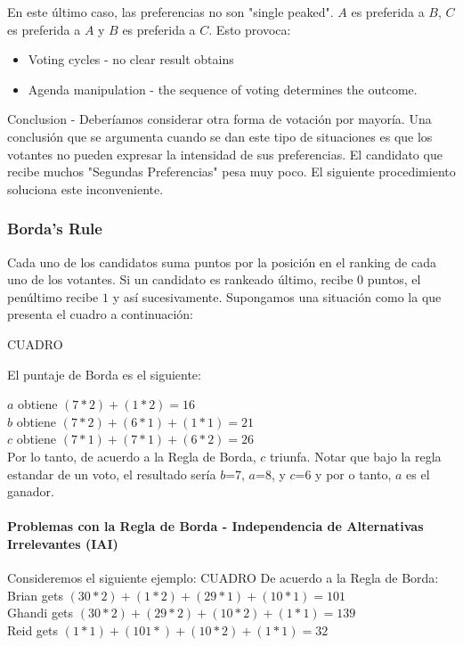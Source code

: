 En este último caso, las preferencias no son "single peaked". $A$ es preferida a $B$, $C$ es preferida a $A$ y $B$ es preferida a $C$. Esto provoca:
\begin{itemize}
 \item Voting cycles - no clear result obtains
 \item Agenda manipulation - the sequence of voting determines the outcome.
\end{itemize}
Conclusion - Deberíamos considerar otra forma de votación por mayoría. Una conclusión que se argumenta cuando se dan este tipo de situaciones es que los votantes no pueden expresar la intensidad de sus preferencias. El candidato que recibe muchos "Segundas Preferencias" pesa muy poco. El siguiente procedimiento soluciona este inconveniente.
\subsubsection{Borda’s Rule}
Cada uno de los candidatos suma puntos por la posición en el ranking de cada uno de los votantes. Si un candidato es rankeado último, recibe $0$ puntos, el penúltimo recibe $1$ y así sucesivamente.
Supongamos una situación como la que presenta el cuadro a continuación:
 
CUADRO
 
El puntaje de Borda es el siguiente:
 
$a$ obtiene $(7*2)+(1*2)=16$ \\
$b$ obtiene $(7*2)+(6*1)+(1*1)=21$ \\
$c$ obtiene $(7*1)+(7*1)+(6*2)=26$ \\
 
Por lo tanto, de acuerdo a la Regla de Borda, $c$ triunfa. Notar que bajo la regla estandar de un voto, el resultado sería $b$=7, $a$=8, y $c$=6 y por o tanto, $a$ es el ganador.
\paragraph{Problemas con la Regla de Borda - Independencia de Alternativas Irrelevantes (IAI)}
Consideremos el siguiente ejemplo:
CUADRO
De acuerdo a la Regla de Borda: \\
 
Brian gets $(30*2) + (1*2) + (29*1) + (10*1) = 101$ \\
Ghandi gets $(30*2) + (29*2) + (10*2) + (1*1) = 139$ \\
Reid gets $(1*1) + (101*) + (10*2) + (1*1) = 32$ \\
 
